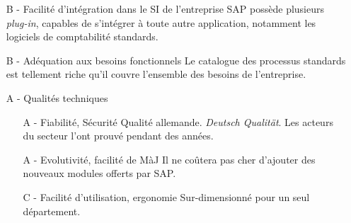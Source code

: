 \begin{itemize}
\item[B -] Facilité d'intégration dans le SI de l'entreprise\el
	SAP possède plusieurs {\sl plug-in}, capables de s'intégrer à toute
    autre application, notamment les logiciels de comptabilité standards.
	
\item[B -] Adéquation aux besoins fonctionnels\el
	Le catalogue des processus standards est tellement riche qu'il
    couvre l'ensemble des besoins de l'entreprise.
	
\item[A -] Qualités techniques\el
    \begin{itemize}
	\item[A -] Fiabilité, Sécurité\el
		Qualité allemande. {\sl Deutsch Qualität}. Les acteurs du
        secteur l'ont prouvé pendant des années.
	
	\item[A -] Evolutivité, facilité de MàJ\el
		Il ne coûtera pas cher d'ajouter des nouveaux modules offerts par SAP. 

	\item[C -] Facilité d'utilisation, ergonomie\el
		Sur-dimensionné pour un seul département.
    \end{itemize}
\end{itemize}
